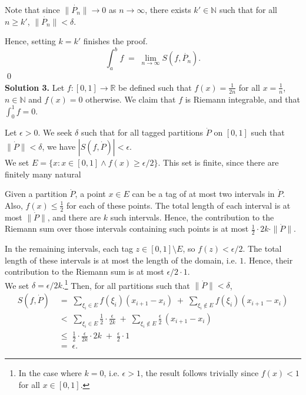 \documentclass[10pt]{article}
\begin{document}
        Note that since $\|\dot{P_n}\| \to 0$ as $n \to \infty$, there exists $k' \in \mathbb{N}$ such that for all $n \ge k'$,
        $\|\dot{P_n}\| < \delta$.

        Hence, setting $k = k'$ finishes the proof.
        \[\int_a^b f \;=\; \lim_{n \to \infty} S(f, \dot{P_n}).\] \qed\\

        \textbf{Solution 3.}
        Let $f\colon [0, 1] \to \mathbb{R}$ be defined such that $f(x) = \frac{1}{2n}$ for all $x = \frac{1}{n}$, $n \in \mathbb{N}$ and
        $f(x) = 0$ otherwise. We claim that $f$ is Riemann integrable, and that $\int_0^1 f = 0$.

        Let $\epsilon > 0$. We seek $\delta$ such that for all tagged partitions $\dot{P}$ on $[0, 1]$ such that $\|\dot{P}\| < \delta$,
        we have $|S(f, \dot{P})| < \epsilon$. \\

        We set $E = \{x : x \in [0, 1] \land f(x) \ge \epsilon/2\}$. This set is finite, since there are finitely many natural 
        
        Given a partition $\dot{P}$, a point $x \in E$ can
        be a tag of at most two intervals in $\dot{P}$. Also, $f(x) \le \frac{1}{2}$ for each of these points.
        The total length of each interval is at most $\|\dot{P}\|$, and there are $k$ such intervals.
        Hence, the contribution to the Riemann sum over those intervals containing such points is at most $\frac{1}{2}\cdot 2k\cdot \|\dot{P}\|$.
        
        In the remaining intervals, each tag $z \in [0, 1]\setminus E$, so $f(z) < \epsilon/2$. The total length of these intervals
        is at most the length of the domain, i.e. $1$. Hence, their contribution to the Riemann sum is at most $\epsilon/2 \cdot 1$.\\
        
        We set $\delta = \epsilon/2k$.\footnote{In the case where $k = 0$, i.e. $\epsilon > 1$, the result follows trivially since $f(x) < 1$ for all 
        $x \in [0, 1]$.}
        Then, for all partitions such that $\|\dot{P}\| < \delta$,
        \begin{align*}
                S(f, \dot{P}) \;&=\; \sum_{\xi_i \in E} f(\xi_i)(x_{i + 1} - x_i) \;+\; \sum_{\xi_i \notin E} f(\xi_i)(x_{i + 1} - x_i) \\
                        \;&<\; \sum_{\xi_i \in E} \frac{1}{2}\cdot \frac{\epsilon}{2k} \;+\; \sum_{\xi_i \notin E} \frac{\epsilon}{2} \,(x_{i + 1} - x_i) \\
                        \;&\le\; \frac{1}{2}\cdot \frac{\epsilon}{2k}\cdot 2k \;+\; \frac{\epsilon}{2} \cdot 1 \\
                        \;&=\; \epsilon.
        \end{align*}
\end{document}

